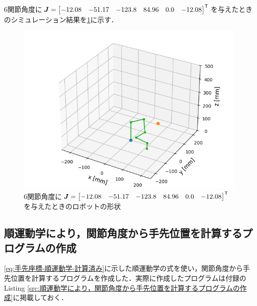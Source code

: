\documentclass{ltjsarticle}
\begin{document}
6関節角度に$\bm{J} = \mqty[-12.08 & -51.17 & -123.8 & 84.96 & 0.0 & -12.08]^\mathsf{T}$を与えたときのシミュレーション結果を\cref{fig:6関節角度に-を与えたときのロボットの形状}に示す．
\begin{figure}[H]
	\centering
	\includegraphics[width = 0.5\linewidth]{../results/program2.png}
	\caption{6関節角度に$\bm{J} = \mqty[-12.08 & -51.17 & -123.8 & 84.96 & 0.0 & -12.08]^\mathsf{T}$を与えたときのロボットの形状}
	\label{fig:6関節角度に-を与えたときのロボットの形状}
\end{figure}

\subsection{順運動学により，関節角度から手先位置を計算するプログラムの作成}\label{subsec:順運動学により，関節角度から手先位置を計算するプログラムの作成}
\cref{eq:手先座標-順運動学-計算済み}に示した順運動学の式を使い，関節角度から手先位置を計算するプログラムを作成した．実際に作成したプログラムは付録のListing \ref{src:順運動学により，関節角度から手先位置を計算するプログラムの作成}に掲載しておく．
\end{document}
